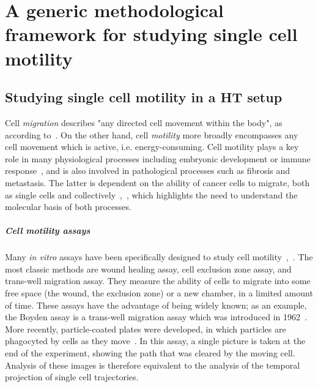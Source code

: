 
\chapter{A generic methodological framework for studying single cell motility}
\section{Studying single cell motility in a HT setup}

Cell \textit{migration} describes "any directed cell movement within the body", as according to~\cite{pmid22940039}. On the other hand, cell \textit{motility} more broadly encompasses any cell movement which is active, i.e. energy-consuming. Cell motility plays a key role in many physiological processes including embryonic development or immune response~\cite{pmid18711433}, and is also involved in pathological processes such as fibrosis and metastasis. The latter is dependent on the ability of cancer cells to migrate, both as single cells and collectively~\cite{pmid16888756},~\cite{pmid20460404}, which highlights the need to understand the molecular basis of both processes.

\paragraph{Cell motility assays}
Many \textit{in vitro} assays have been specifically designed to study cell motility~\cite{pmid16888756},~\cite{pmid22940039}. The most classic methods are wound healing assay, cell exclusion zone assay, and trans-well migration assay. They measure the ability of cells to migrate into some free space (the wound, the exclusion zone) or a new chamber, in a limited amount of time. These assays have the advantage of being widely known; as an example, the Boyden assay is a trans-well migration assay which was introduced in 1962~\cite{pmid13872176}. More recently, particle-coated plates were developed, in which particles are phagocyted by cells as they move~\cite{pmid329998}.
In this assay, a single picture is taken at the end of the experiment,
showing the path that was cleared by the moving cell. Analysis of
these images is therefore equivalent to the analysis of the temporal
projection of single cell trajectories.  

